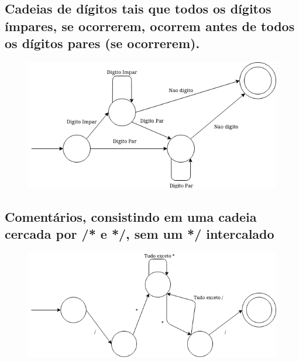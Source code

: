 \documentclass{article}
\begin{document}
\newpage

\subsection{Cadeias de dígitos tais que todos os dígitos ímpares, se ocorrerem, ocorrem antes de todos os dígitos pares (se ocorrerem).}

\begin{figure}[h]
  \centering
    \includegraphics[scale=0.5]{./imgs/third.png}
\end{figure}

\subsection{Comentários, consistindo em uma cadeia cercada por /* e */, sem um */ intercalado}

\begin{figure}[h]
  \centering
    \includegraphics[scale=0.5]{./imgs/fourth.png}
\end{figure}
\end{document}
